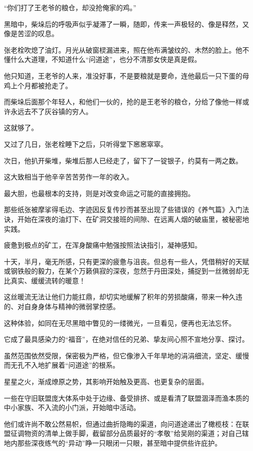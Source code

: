“你们打了王老爷的粮仓，却没抢俺家的鸡。”

黑暗中，柴垛后的呼吸声似乎凝滞了一瞬，随即，传来一声极轻的、像是释然，又像是苦涩的叹息。

张老栓吹熄了油灯。月光从破窗棂漏进来，照在他布满皱纹的、木然的脸上。他不懂什么大道理，不知道什么“问道途”，也分不清那女侠是真是假。

他只知道，王老爷的人来，准没好事，不是要粮就是要命，连他最后一只下蛋的母鸡上个月都被抢走了。

而柴垛后面那个年轻人，和他们一伙的，抢的是王老爷的粮仓，分给了像他一样或许永远去不了灰谷镇的穷人。

这就够了。

又过了几日，张老栓睡下之后，只听得堂下窸窸窣窣。

次日，他扒开柴堆，柴堆后那人已经走了，留下了一锭银子，约莫有一两之数。

这大致相当于他辛辛苦苦劳作一年的收入。

\vspace{2em}

最大胆，也最根本的支持，则是对改变命运之可能的直接拥抱。

那些纸张被摩挲得毛边、字迹因反复传抄而甚至出现了些错误的《养气篇》入门法诀，开始在深夜的油灯下、在矿洞交接班的间隙、在远离人烟的破庙里，被秘密地实践。

疲惫到极点的矿工，在浑身酸痛中勉强按照法诀指引，凝神感知。

十天，半月，毫无所感，只有更深的疲惫与沮丧。但总有一些人，凭借稍好的天赋或钢铁般的毅力，在某个万籁俱寂的深夜，忽然于丹田深处，捕捉到一丝微弱却无比真实、缓缓流转的暖意！

这丝暖流无法让他们力能扛鼎，却切实地缓解了积年的劳损酸痛，带来一种久违的、对自身身体与精神的微弱掌控感。

这种体验，如同在无尽黑暗中瞥见的一缕微光，一旦看见，便再也无法忘怀。

它成了最具感染力的“福音”，在绝对信任的兄弟、挚友间心照不宣地分享、探讨。

虽然范围依然受限，保密极为严格，但它像渗入千年旱地的涓涓细流，坚定、缓慢而无孔不入地扩展着“问道途”的根系。

星星之火，渐成燎原之势，其影响开始触及更高、也更复杂的层面。

一些在守旧联盟庞大体系中处于边缘、备受排挤、或是看清了联盟涸泽而渔本质的中小家族、不入流的小门派，开始暗中活动。

他们或许尚不敢公然易帜，但通过曲折隐晦的渠道，向问道途递出了橄榄枝：在联盟征调物资的清单上做手脚，截留部分品质最好的“孝敬”给吴刚的渠道；对自己辖地内那些深夜练气的“异动”睁一只眼闭一只眼，甚至暗中提供些许庇护。

